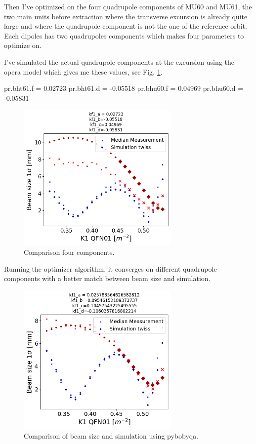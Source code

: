 Then I've optimized on the four quadrupole components of MU60 and MU61, the two main units before extraction where the transverse excursion is already quite large and where the quadrupole component is not the one of the reference orbit. Each dipoles has two quadrupoles components which makes four parameters to optimize on.

I've simulated the actual quadrupole components at the excursion using the opera model which gives me these values, see Fig. \ref{fig:comparison_four_compo}.

pr.bht61.f = 0.02723
pr.bht61.d = -0.05518
pr.bhu60.f = 0.04969
pr.bhu60.d = -0.05831

\begin{figure}[H]
\centering
\includegraphics[width=0.7\textwidth]{02_Simulation/images/comparison_sim_meas_four_compo.png}
\caption{Comparison four components.}
\label{fig:comparison_four_compo}
\end{figure}

Running the optimizer algorithm, it converges on different quadrupole components with a better match between beam size and simulation.

\begin{figure}[H]
\centering
\includegraphics[width=0.7\textwidth]{02_Simulation/images/comparison_sim_meas_bobyqa.png}
\caption{Comparison of beam size and simulation using pybobyqa.}
\label{fig:comparison_bobyqa}
\end{figure}

